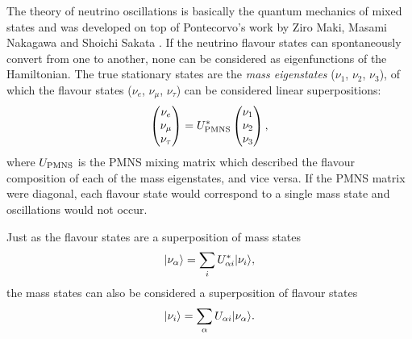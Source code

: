 The theory of neutrino oscillations is basically the quantum mechanics of mixed states and was developed on top of Pontecorvo's work by Ziro Maki, Masami Nakagawa and Shoichi Sakata \cite{MNS1962}.  If the neutrino flavour states can spontaneously convert from one to another, none can be considered as eigenfunctions of the Hamiltonian.  The true stationary states are the \textit{mass eigenstates} ($\nu_1$, $\nu_2$, $\nu_3$), of which the flavour states ($\nu_e$, $\nu_{\mu}$, $\nu_{\tau}$) can be considered linear superpositions:
\begin{equation}
  \begin{pmatrix}
    \nu_e \\
    \nu_{\mu} \\
    \nu_{\tau} \\
  \end{pmatrix}
  =
  U^*_{\textnormal{PMNS}}
  \begin{pmatrix}
    \nu_1 \\
    \nu_2 \\
    \nu_3 \\
  \end{pmatrix},
  \label{eq:FlavourMassStates}
\end{equation}
where $U_{\textnormal{PMNS}}$ is the PMNS mixing matrix which described the flavour composition of each of the mass eigenstates, and vice versa.  If the PMNS matrix were diagonal, each flavour state would correspond to a single mass state and oscillations would not occur.

Just as the flavour states are a superposition of mass states
\begin{equation}\label{eq:FlavourSuperposition}
  \lvert\nu_{\alpha}\rangle = \sum_i U^*_{\alpha i} \lvert\nu_i\rangle,
\end{equation}
the mass states can also be considered a superposition of flavour states
\begin{equation}\label{eq:MassSuperposition}
  \lvert\nu_i\rangle = \sum_{\alpha} U_{\alpha i} \lvert\nu_{\alpha}\rangle.
\end{equation}

